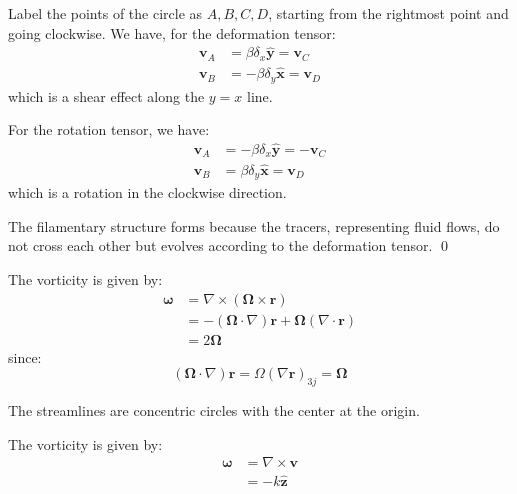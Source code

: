 \documentclass[12pt]{article}
\begin{document}
Label the points of the circle as $A, B, C, D$, starting from the rightmost point and going clockwise. We have, for the deformation tensor:
\begin{equation}
    \begin{split}
        \mathbf{v}_{A} &= \beta \delta_{x} \hat{\mathbf{y}} = \mathbf{v}_{C} \\
        \mathbf{v}_{B} &= -\beta \delta_{y} \hat{\mathbf{x}} = \mathbf{v}_{D}
    \end{split}
\end{equation}
which is a shear effect along the $y = x$ line.

For the rotation tensor, we have:
\begin{equation}
    \begin{split}
        \mathbf{v}_{A} &= -\beta \delta_{x} \hat{\mathbf{y}} = -\mathbf{v}_{C} \\
        \mathbf{v}_{B} &= \beta \delta_{y} \hat{\mathbf{x}} = \mathbf{v}_{D}
    \end{split}
\end{equation}
which is a rotation in the clockwise direction.

The filamentary structure forms because the tracers, representing fluid flows, do not cross each other but evolves according to the deformation tensor.
\qed



The vorticity is given by:
\begin{equation}
    \begin{split}
        \mathbf{\omega} &= \nabla \times (\mathbf{\Omega} \times \mathbf{r}) \\
        &= -(\mathbf{\Omega} \cdot \nabla) \mathbf{r} + \mathbf{\Omega} (\nabla \cdot \mathbf{r}) \\
        &= 2 \mathbf{\Omega}
    \end{split}
\end{equation}
since:
\begin{equation}
    (\mathbf{\Omega} \cdot \nabla) \mathbf{r}= \Omega (\nabla \mathbf{r})_{3j} = \mathbf{\Omega}
\end{equation}

The streamlines are concentric circles with the center at the origin.

The vorticity is given by:
\begin{equation}
    \begin{split}
        \mathbf{\omega} &= \nabla \times \mathbf{v} \\
        &= -k \hat{\mathbf{z}}
    \end{split}
\end{equation}
\end{document}
